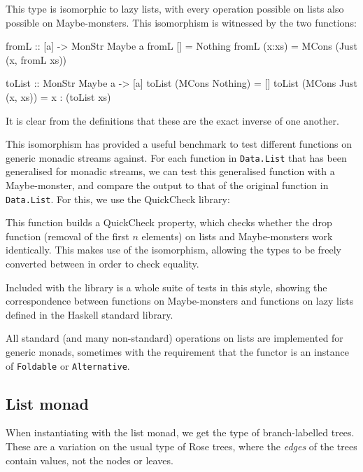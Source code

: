 This type is isomorphic to lazy lists, with every operation possible on lists also possible on Maybe-monsters. This isomorphism is witnessed by the two functions:

\begin{haskell}
fromL :: [a] -> MonStr Maybe a
fromL [] = Nothing
fromL (x:xs) = MCons (Just (x, fromL xs))

toList :: MonStr Maybe a -> [a]
toList (MCons Nothing) = []
toList (MCons Just (x, xs)) = x : (toList xs)
\end{haskell} 

It is clear from the definitions that these are the exact inverse of one another. 

This isomorphism has provided a useful benchmark to test different functions on generic monadic streams against. For each function in \verb+Data.List+ that has been generalised for monadic streams, we can test this generalised function with a Maybe-monster, and compare the output to that of the original function in \verb+Data.List+. For this, we use the QuickCheck library:


This function builds a QuickCheck property, which checks whether the drop function (removal of the first $n$ elements) on lists and Maybe-monsters work identically. This makes use of the isomorphism, allowing the types to be freely converted between in order to check equality. 

Included with the library is a whole suite of tests in this style, showing the correspondence between functions on Maybe-monsters and functions on lazy lists defined in the Haskell standard library.

All standard (and many non-standard) operations on lists are implemented for generic monads, sometimes with the requirement that the functor is an instance of \verb+Foldable+ or \verb+Alternative+.

\subsection{List monad}

When instantiating with the list monad, we get the type of branch-labelled trees. These are a variation on the usual type of Rose trees, where the \emph{edges} of the trees contain values, not the nodes or leaves.

